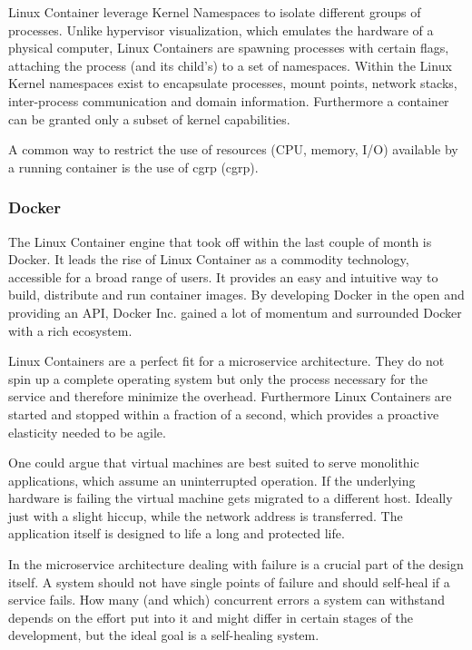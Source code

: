 Linux Container leverage Kernel Namespaces to isolate different groups of processes. Unlike hypervisor visualization, which emulates
the hardware of a physical computer, Linux Containers are spawning processes with certain flags, attaching the process (and its child's)
to a set of namespaces. Within the Linux Kernel namespaces exist to encapsulate processes, mount points, network stacks,
inter-process communication and domain information. Furthermore a container can be granted only a subset of kernel capabilities.

A common way to restrict the use of resources (CPU, memory, I/O) available by a running container is the use of \gls{cgrp} (\glsdesc{cgrp}).

\subsubsection{Docker}
The Linux Container engine that took off within the last couple of month is Docker. It leads the rise of Linux Container as a commodity technology, accessible
for a broad range of users. It provides an easy and intuitive way to build, distribute and run container images.
By developing Docker in the open and providing an API, Docker Inc. gained a lot of momentum and surrounded Docker with a rich ecosystem.

Linux Containers are a perfect fit for a microservice architecture. They do not spin up a complete operating system but only the process
necessary for the service and therefore minimize the overhead. Furthermore Linux Containers are started and stopped within a
fraction of a second, which provides a proactive elasticity needed to be agile.

One could argue that virtual machines are best suited to serve monolithic applications,
which assume an uninterrupted operation. If the underlying hardware is failing the virtual machine gets migrated to a different host. Ideally just
with a slight hiccup, while the network address is transferred. The application itself is designed to life a long and protected life.

In the microservice architecture dealing with failure is a crucial part of the design itself. A system should not have single points of failure and
should self-heal if a service fails. How many (and which) concurrent errors a system can withstand depends on the effort put into it and might differ
in certain stages of the development, but the ideal goal is a self-healing system.


